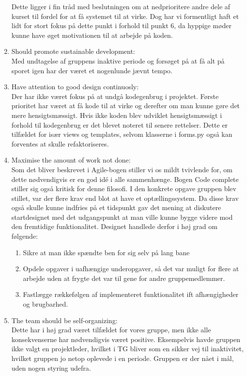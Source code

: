 \documentclass[]{article}
\begin{document}
\begin{enumerate}
Dette ligger i fin tråd med beslutningen om at nedprioritere andre dele af kurset til fordel for at få systemet til at virke. Dog har vi formentligt haft et lidt for stort fokus på dette punkt i forhold til punkt 6, da hyppige møder kunne have øget motivationen til at arbejde på koden.
    \item Should promote sustainable development: \\
Med undtagelse af gruppens inaktive periode og forsøget på at få alt på sporet igen har der været et nogenlunde jævnt tempo.
    \item Have attention to good design continuosly: \\
Der har ikke været fokus på at undgå kodegenbrug i projektet. Første prioritet har været at få kode til at virke og derefter om man kunne gøre det mere hensigtsmæssigt. Hvis ikke koden blev udviklet hensigtsmæssigt i forhold til kodegenbrug er det blevet noteret til senere rettelser. Dette er tilfældet for især views og templates, selvom klasserne i forms.py også kan forventes at skulle refaktoriseres.
    \item Maximise the amount of work not done: \\
Som det bliver beskrevet i Agile-bogen stiller vi os mildt tvivlende for, om dette nødvendigvis er en god idé i alle sammenhænge. Bogen Code complete stiller sig også kritisk for denne filosofi. I den konkrete opgave gruppen blev stillet, var der flere krav end blot at have et optællingssystem. Da disse krav også skulle kunne indfries på et tidspunkt gav det mening at diskutere startdesignet med det udgangspunkt at man ville kunne bygge videre mod den fremtidige funktionalitet. Designet handlede derfor i høj grad om følgende:
    \begin{enumerate}
        \item Sikre at man ikke spændte ben for sig selv på lang bane
        \item Opdele opgaver i uafhængige underopgaver, så det var muligt for flere at arbejde uden at frygte det var til gene for andre gruppemedlemmer.
        \item Fastlægge rækkefølgen af implementeret funktionalitet ift afhængigheder og brugbarhed.
    \end{enumerate}
    \item The team should be self-organizing: \\
Dette har i høj grad været tilfældet for vores gruppe, men ikke alle konsekvenserne har nødvendigvis været positive. Eksempelvis havde gruppen ikke valgt en projektleder, hvilket i TG bliver som en sikker vej til inaktivitet, hvilket gruppen jo netop oplevede i en periode. Gruppen er der nået i mål, uden nogen styring udefra. 

\end{enumerate}
\end{document}
